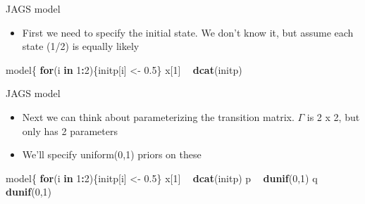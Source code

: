\documentclass[
  ignorenonframetext,
]{beamer}
\newenvironment{Shaded}{\begin{snugshade}}{\end{snugshade}}
\newcommand{\ControlFlowTok}[1]{\textcolor[rgb]{0.13,0.29,0.53}{\textbf{#1}}}
\newcommand{\DecValTok}[1]{\textcolor[rgb]{0.00,0.00,0.81}{#1}}
\newcommand{\FloatTok}[1]{\textcolor[rgb]{0.00,0.00,0.81}{#1}}
\newcommand{\KeywordTok}[1]{\textcolor[rgb]{0.13,0.29,0.53}{\textbf{#1}}}
\newcommand{\NormalTok}[1]{#1}
\newcommand{\OperatorTok}[1]{\textcolor[rgb]{0.81,0.36,0.00}{\textbf{#1}}}
\newcommand{\StringTok}[1]{\textcolor[rgb]{0.31,0.60,0.02}{#1}}
\providecommand{\tightlist}{%
  \setlength{\itemsep}{0pt}\setlength{\parskip}{0pt}}
\begin{document}
\begin{frame}[fragile]{JAGS model}
\protect\hypertarget{jags-model}{}

\begin{itemize}
\tightlist
\item
  First we need to specify the initial state. We don't know it, but
  assume each state (1/2) is equally likely
\end{itemize}

\begin{Shaded}
\begin{Highlighting}[]
\NormalTok{model\{}
\ControlFlowTok{for}\NormalTok{(i }\ControlFlowTok{in} \DecValTok{1}\OperatorTok{:}\DecValTok{2}\NormalTok{)\{initp[i] <-}\StringTok{ }\FloatTok{0.5}\NormalTok{\}}
\NormalTok{x[}\DecValTok{1}\NormalTok{] }\OperatorTok{~}\StringTok{ }\KeywordTok{dcat}\NormalTok{(initp)}
\end{Highlighting}
\end{Shaded}

\end{frame}

\begin{frame}[fragile]{JAGS model}
\protect\hypertarget{jags-model-1}{}

\begin{itemize}
\tightlist
\item
  Next we can think about parameterizing the transition matrix.
  \(\Gamma\) is 2 x 2, but only has 2 parameters
\item
  We'll specify uniform(0,1) priors on these
\end{itemize}

\begin{Shaded}
\begin{Highlighting}[]
\NormalTok{model\{}
\ControlFlowTok{for}\NormalTok{(i }\ControlFlowTok{in} \DecValTok{1}\OperatorTok{:}\DecValTok{2}\NormalTok{)\{initp[i] <-}\StringTok{ }\FloatTok{0.5}\NormalTok{\}}
\NormalTok{x[}\DecValTok{1}\NormalTok{] }\OperatorTok{~}\StringTok{ }\KeywordTok{dcat}\NormalTok{(initp)}
\NormalTok{p }\OperatorTok{~}\StringTok{ }\KeywordTok{dunif}\NormalTok{(}\DecValTok{0}\NormalTok{,}\DecValTok{1}\NormalTok{)}
\NormalTok{q }\OperatorTok{~}\StringTok{ }\KeywordTok{dunif}\NormalTok{(}\DecValTok{0}\NormalTok{,}\DecValTok{1}\NormalTok{)}
\end{Highlighting}
\end{Shaded}

\end{frame}
\end{document}
